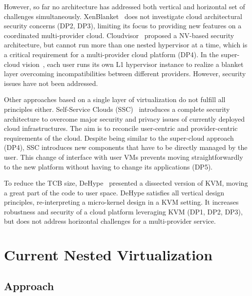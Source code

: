 \documentclass{sig-alternate}
\begin{document}
However, so far no architecture has addressed both vertical and horizontal set of challenges simultaneously. XenBlanket~\cite{art:blan} does not investigate cloud architectural security concerns (DP2, DP3), limiting its focus to providing new features on a coordinated multi-provider cloud. Cloudvisor~\cite{cloudvisor:zhang} proposed a NV-based security architecture, but cannot run more than one nested hypervisor at a time, which is a critical requirement for a multi-provider cloud platform (DP4). In the super-cloud vision~\cite{xclo:blank}, each user runs its own L1 hypervisor instance to realize  a blanket layer overcoming incompatibilities between different providers. However, security issues have not been addressed.

Other approaches based on a single layer of virtualization do not fulfill all principles either. Self-Service Clouds (SSC)~\cite{ssc:art} introduces a complete security architecture to overcome major security and privacy issues of currently deployed cloud infrastructures. The aim is to reconcile user-centric and provider-centric requirements of the cloud. Despite being similar to the super-cloud approach (DP4), SSC introduces new components that have to be directly managed by the user. This change of interface with user VMs prevents moving straightforwardly to the new platform without having to change its applications (DP5).

To reduce the TCB size, DeHype~\cite{wu2013TamHosHypMosDepExe} presented a dissected version of KVM, moving a great part of the code to user space. DeHype satisfies all vertical design principles, re-interpreting a micro-kernel design in a KVM setting. It increases robustness and security of a cloud platform leveraging KVM (DP1, DP2, DP3), but does not address horizontal challenges for a multi-provider service.

\section{Current Nested Virtualization}
\label{sec:classic}

\subsection{Approach}
\end{document}
